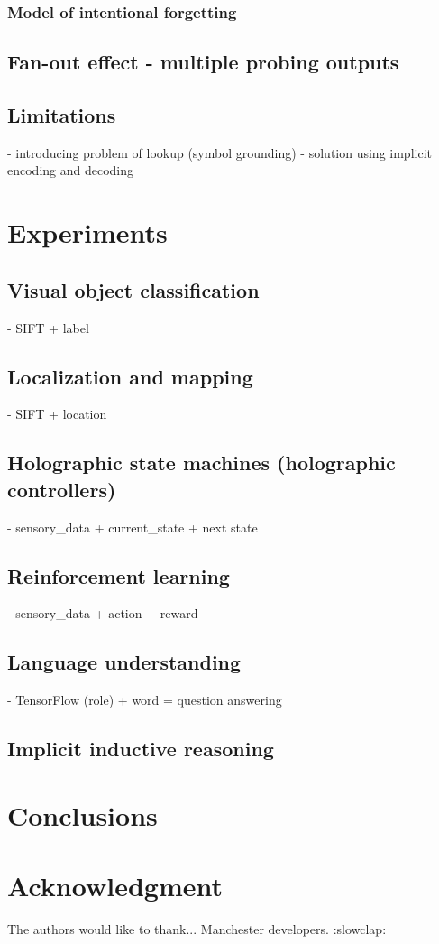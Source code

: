 \documentclass[conference]{IEEEtran}
\begin{document}
\subsubsection{Model of intentional forgetting}

\subsection{Fan-out effect - multiple probing outputs}

\subsection{Limitations}

- introducing problem of lookup (symbol grounding)
- solution using implicit encoding and decoding

\section{Experiments}

\subsection{Visual object classification}
- SIFT + label
\subsection{Localization and mapping}
- SIFT + location
\subsection{Holographic state machines (holographic controllers)}
- sensory\_data + current\_state + next state
\subsection{Reinforcement learning}
- sensory\_data + action + reward
\subsection{Language understanding}
- TensorFlow (role) + word = question answering
\subsection{Implicit inductive reasoning}

\section{Conclusions}


\section*{Acknowledgment}

The authors would like to thank... Manchester developers. :slowclap:



 





\end{document}
